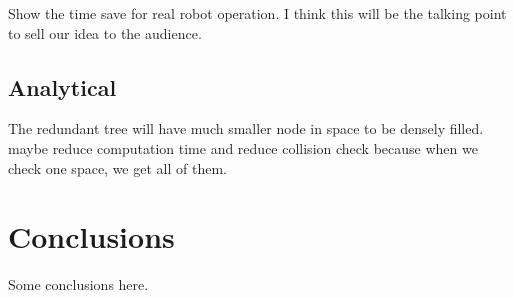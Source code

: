 Show the time save for real robot operation. I think this will be the talking point to sell our idea to the audience.




\subsection{Analytical}

The redundant tree will have much smaller node in space to be densely filled. maybe reduce computation time and reduce collision check because when we check one space, we get all of them.


\section{Conclusions}
Some conclusions here.



\clearpage
\printbibliography[heading=subbibliography, title=\bibname\ for \chaptername~\thechapter]
